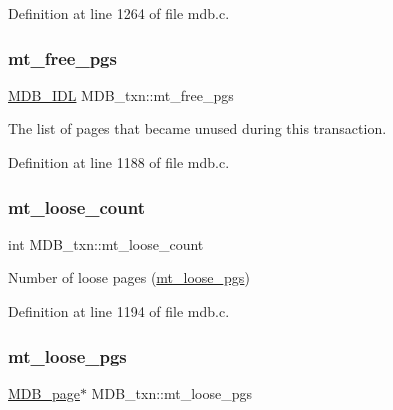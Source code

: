 Definition at line 1264 of file mdb.\+c.

\mbox{\label{struct_m_d_b__txn_a587e53ee229e04345eaba8e4f300c84a}} 
\subsubsection{\texorpdfstring{mt\+\_\+free\+\_\+pgs}{mt\_free\_pgs}}
{\footnotesize\ttfamily \mbox{\hyperlink{group__idls_ga238cc39c422225e05cb3897e641ca9e5}{M\+D\+B\+\_\+\+I\+DL}} M\+D\+B\+\_\+txn\+::mt\+\_\+free\+\_\+pgs}

The list of pages that became unused during this transaction. 

Definition at line 1188 of file mdb.\+c.

\mbox{\label{struct_m_d_b__txn_a2ff868cf712335c9c596ac8b10d73505}} 
\subsubsection{\texorpdfstring{mt\+\_\+loose\+\_\+count}{mt\_loose\_count}}
{\footnotesize\ttfamily int M\+D\+B\+\_\+txn\+::mt\+\_\+loose\+\_\+count}

Number of loose pages (\mbox{\hyperlink{struct_m_d_b__txn_a8ba581e64700739d049e172456305138}{mt\+\_\+loose\+\_\+pgs}}) 

Definition at line 1194 of file mdb.\+c.

\mbox{\label{struct_m_d_b__txn_a8ba581e64700739d049e172456305138}} 
\subsubsection{\texorpdfstring{mt\+\_\+loose\+\_\+pgs}{mt\_loose\_pgs}}
{\footnotesize\ttfamily \mbox{\hyperlink{struct_m_d_b__page}{M\+D\+B\+\_\+page}}$\ast$ M\+D\+B\+\_\+txn\+::mt\+\_\+loose\+\_\+pgs}

